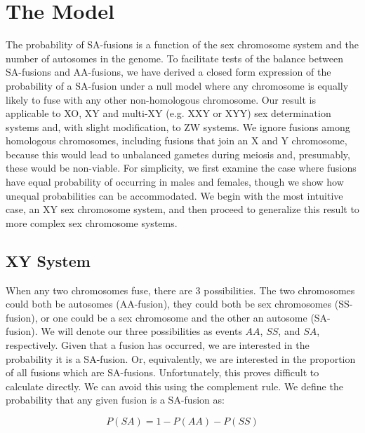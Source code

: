 \documentclass[12pt]{article}
\begin{document}
\section{The Model}
The probability of SA-fusions is a function of the sex chromosome system and the number of autosomes in the genome.
To facilitate tests of the balance between SA-fusions and AA-fusions, we have derived a closed form expression of the probability of a SA-fusion under a null model where any chromosome is equally likely to fuse with any other non-homologous chromosome.
Our result is applicable to XO, XY and multi-XY (e.g. XXY or XYY) sex determination systems and, with slight modification, to ZW systems.
We ignore fusions among homologous chromosomes, including fusions that join an X and Y chromosome, because this would lead to unbalanced gametes during meiosis and, presumably, these would be non-viable.
For simplicity, we first examine the case where fusions have equal probability of occurring in males and females, though we show how unequal probabilities can be accommodated.
We begin with the most intuitive case, an XY sex chromosome system, and then proceed to generalize this result to more complex sex chromosome systems.

\subsection{XY System}
When any two chromosomes fuse, there are 3 possibilities. 
The two chromosomes could both be autosomes (AA-fusion), they could both be sex chromosomes (SS-fusion), or one could be a sex chromosome and the other an autosome (SA-fusion). 
We will denote our three possibilities as events $AA$, $SS$, and $SA$, respectively. 
Given that a fusion has occurred, we are interested in the probability it is a SA-fusion.
Or, equivalently, we are interested in the proportion of all fusions which are SA-fusions. 
Unfortunately, this proves difficult to calculate directly. We can avoid this using the complement rule. 
We define the probability that any given fusion is a SA-fusion as:

\begin{equation} \label{eq1}
P(SA)=1-P(AA)-P(SS)
\end{equation}
\end{document}
